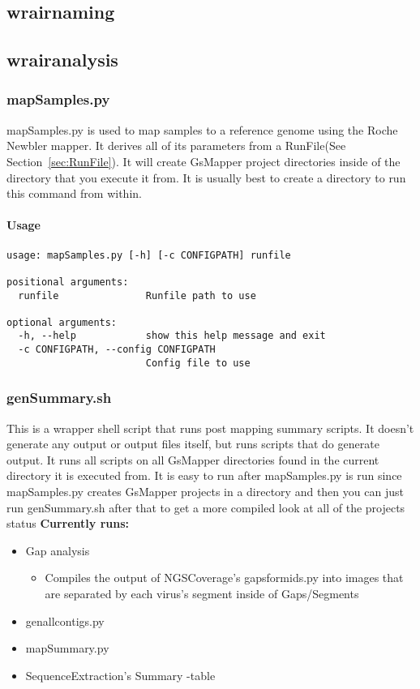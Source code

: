 \documentclass{article}
\begin{document}
\subsection{wrairnaming}

\subsection{wrairanalysis}

\subsubsection{mapSamples.py}
mapSamples.py is used to map samples to a reference genome using the Roche Newbler mapper.
It derives all of its parameters from a RunFile(See Section~\ref{sec:RunFile}).
It will create GsMapper project directories inside of the directory that you execute it from. It is usually best to create a directory to run 
this command from within.

\paragraph{Usage}

\begin{lstlisting}
usage: mapSamples.py [-h] [-c CONFIGPATH] runfile

positional arguments:
  runfile               Runfile path to use

optional arguments:
  -h, --help            show this help message and exit
  -c CONFIGPATH, --config CONFIGPATH
                        Config file to use
\end{lstlisting}

\subsubsection{genSummary.sh}
This is a wrapper shell script that runs post mapping summary scripts. It doesn't generate any output or output files itself, but runs scripts that
do generate output.
It runs all scripts on all GsMapper directories found in the current directory it is executed from.
It is easy to run after mapSamples.py is run since mapSamples.py creates GsMapper projects in a directory and then you can just run genSummary.sh 
after that to get a more compiled look at all of the projects status
\textbf{Currently runs:}
\begin{itemize}
 \item Gap analysis
  \begin{itemize}
   \item Compiles the output of NGSCoverage's gapsformids.py into images that are separated by each virus's segment inside of Gaps/Segments
  \end{itemize}
 \item genallcontigs.py
 \item mapSummary.py 
 \item SequenceExtraction's Summary -table
\end{itemize}
\end{document}
